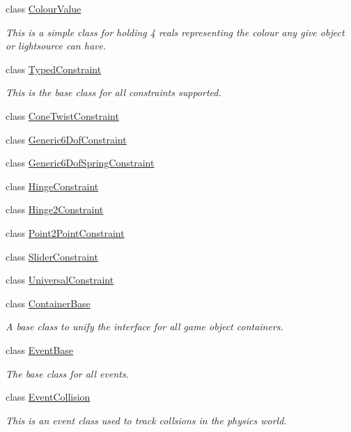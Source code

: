 \begin{DoxyCompactItemize}
class \hyperlink{classphys_1_1ColourValue}{ColourValue}
\begin{DoxyCompactList}\small\item\em This is a simple class for holding 4 reals representing the colour any give object or lightsource can have. \item\end{DoxyCompactList}\item 
class \hyperlink{classphys_1_1TypedConstraint}{TypedConstraint}
\begin{DoxyCompactList}\small\item\em This is the base class for all constraints supported. \item\end{DoxyCompactList}\item 
class \hyperlink{classphys_1_1ConeTwistConstraint}{ConeTwistConstraint}
\item 
class \hyperlink{classphys_1_1Generic6DofConstraint}{Generic6DofConstraint}
\item 
class \hyperlink{classphys_1_1Generic6DofSpringConstraint}{Generic6DofSpringConstraint}
\item 
class \hyperlink{classphys_1_1HingeConstraint}{HingeConstraint}
\item 
class \hyperlink{classphys_1_1Hinge2Constraint}{Hinge2Constraint}
\item 
class \hyperlink{classphys_1_1Point2PointConstraint}{Point2PointConstraint}
\item 
class \hyperlink{classphys_1_1SliderConstraint}{SliderConstraint}
\item 
class \hyperlink{classphys_1_1UniversalConstraint}{UniversalConstraint}
\item 
class \hyperlink{classphys_1_1ContainerBase}{ContainerBase}
\begin{DoxyCompactList}\small\item\em A base class to unify the interface for all game object containers. \item\end{DoxyCompactList}\item 
class \hyperlink{classphys_1_1EventBase}{EventBase}
\begin{DoxyCompactList}\small\item\em The base class for all events. \item\end{DoxyCompactList}\item 
class \hyperlink{classphys_1_1EventCollision}{EventCollision}
\begin{DoxyCompactList}\small\item\em This is an event class used to track collsions in the physics world. \item\end{DoxyCompactList}\item 

\end{DoxyCompactItemize}
